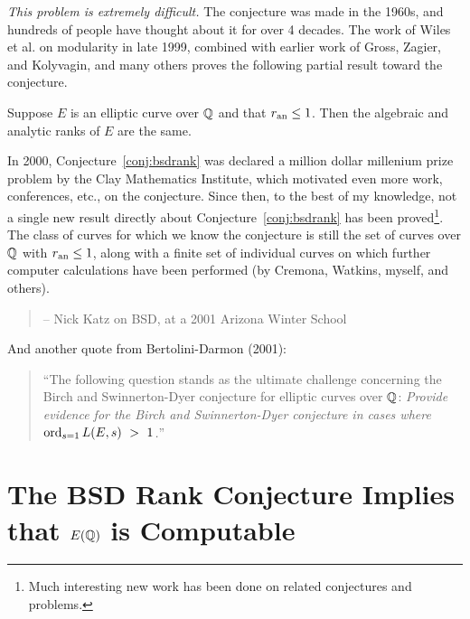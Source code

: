 {\em This problem is extremely difficult.}  The conjecture was made
in the 1960s, and hundreds of people have thought about it
for over 4 decades.  
The work of Wiles et al. on modularity in late 1999,
combined with earlier work of Gross, Zagier, and Kolyvagin,
and many others proves the following partial result toward
the conjecture.

\begin{theorem}
Suppose $E$ is an elliptic curve over $\mathbb{Q}$ and that $r_{{\rm an}} \leq 1$. 
Then the algebraic and analytic ranks of $E$ are the same. 
\end{theorem}

In 2000, Conjecture~\ref{conj:bsdrank} was declared a million dollar
millenium prize problem by the Clay Mathematics Institute, which
motivated even more work, conferences, etc., on the conjecture.  Since
then, to the best of my knowledge, not a single new result directly
about Conjecture~\ref{conj:bsdrank} has been 
proved\footnote{Much interesting new work
has been done on related conjectures and problems.}.  
The class of curves for which
we know the conjecture is still the set of curves over $\mathbb{Q}$ with
$r_{{\rm an}} \leq 1$, along with a finite set of individual curves on
which further computer calculations have been performed (by Cremona,
Watkins, myself, and others).

\begin{quote}

-- Nick Katz on BSD, at a 2001 Arizona Winter School
\end{quote}

And another quote from Bertolini-Darmon (2001):
\begin{quote}
``The following question stands as the ultimate
challenge concerning the Birch and Swinnerton-Dyer conjecture
for elliptic curves over $\mathbb{Q}$: {\em Provide evidence for
the Birch and Swinnerton-Dyer conjecture in cases where~$\operatorname{ord}_{s=1} L(E,s)~>~1$.}''
\end{quote}


\section{The BSD Rank Conjecture Implies that $E(\mathbb{Q})$ is Computable}\label{sec:bsdimpliescomputable}


